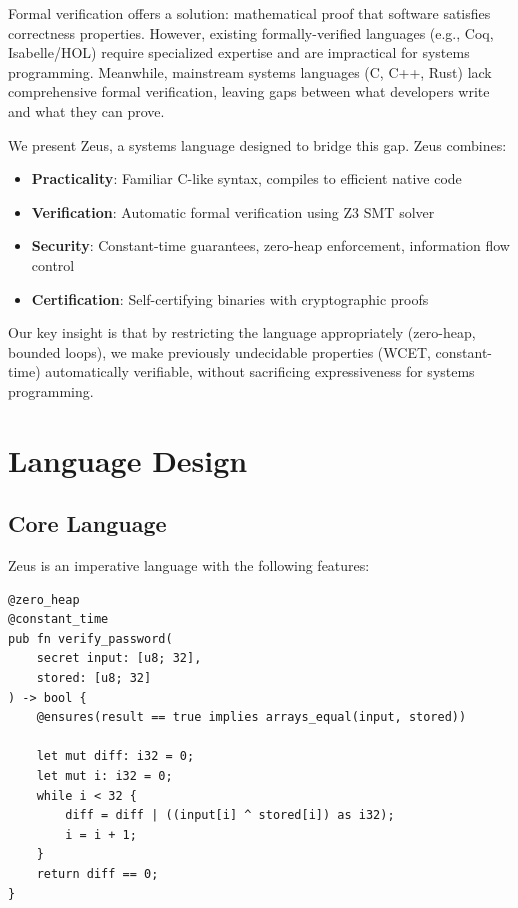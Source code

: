 \documentclass[sigplan,screen]{acmart}
\begin{document}
Formal verification offers a solution: mathematical proof that software satisfies correctness properties. However, existing formally-verified languages (e.g., Coq, Isabelle/HOL) require specialized expertise and are impractical for systems programming. Meanwhile, mainstream systems languages (C, C++, Rust) lack comprehensive formal verification, leaving gaps between what developers write and what they can prove.

We present Zeus, a systems language designed to bridge this gap. Zeus combines:
\begin{itemize}
\item \textbf{Practicality}: Familiar C-like syntax, compiles to efficient native code
\item \textbf{Verification}: Automatic formal verification using Z3 SMT solver
\item \textbf{Security}: Constant-time guarantees, zero-heap enforcement, information flow control
\item \textbf{Certification}: Self-certifying binaries with cryptographic proofs
\end{itemize}

Our key insight is that by restricting the language appropriately (zero-heap, bounded loops), we make previously undecidable properties (WCET, constant-time) automatically verifiable, without sacrificing expressiveness for systems programming.

\section{Language Design}

\subsection{Core Language}

Zeus is an imperative language with the following features:

\begin{lstlisting}[language=Zeus,caption=Example Zeus program]
@zero_heap
@constant_time
pub fn verify_password(
    secret input: [u8; 32],
    stored: [u8; 32]
) -> bool {
    @ensures(result == true implies arrays_equal(input, stored))
    
    let mut diff: i32 = 0;
    let mut i: i32 = 0;
    while i < 32 {
        diff = diff | ((input[i] ^ stored[i]) as i32);
        i = i + 1;
    }
    return diff == 0;
}
\end{lstlisting}
\end{document}
